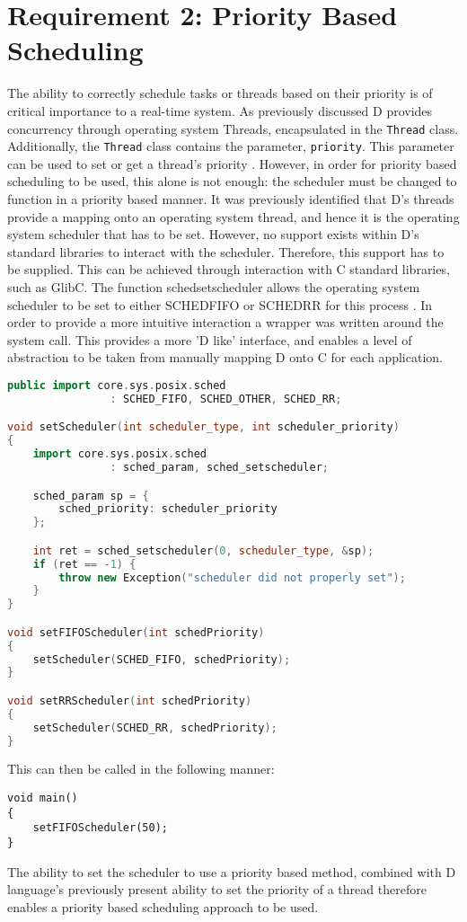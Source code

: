 \section{Requirement 2: Priority Based Scheduling}
The ability to correctly schedule tasks or threads based on their priority is of 
critical importance to a real-time system. As previously discussed D provides 
concurrency through operating system Threads, encapsulated in the
\texttt{Thread} class. Additionally, the \texttt{Thread} class contains the 
parameter, \texttt{priority}. This parameter can be used to set or get a thread's 
priority \cite{core-thread}. 
However, in order for priority based scheduling to be used, this alone is not 
enough: the scheduler must be changed to function in a priority based manner. 
It was previously identified that D's threads provide a mapping onto an operating  
system thread, and hence it is the operating system scheduler that has to be set.  
However, no support exists within D's standard libraries to interact with the
scheduler. 
Therefore, this support has to be supplied. 
This can be achieved through interaction with C standard libraries, such as GlibC. 
The function sched\textunderscore{}setscheduler allows the operating system 
scheduler to be set to either SCHED\textunderscore{}FIFO or SCHED\textunderscore{}RR for 
this process \cite{sched-setscheduler}. 
In order to provide a more intuitive interaction a wrapper was written around the 
system call. This provides a more 'D like' interface, and enables a level of
abstraction to be taken from manually mapping D onto C for each application. 
\begin{lstlisting}[language=C++]
public import core.sys.posix.sched 
                : SCHED_FIFO, SCHED_OTHER, SCHED_RR; 

void setScheduler(int scheduler_type, int scheduler_priority)
{
    import core.sys.posix.sched 
                : sched_param, sched_setscheduler; 

    sched_param sp = { 
        sched_priority: scheduler_priority 
    }; 

    int ret = sched_setscheduler(0, scheduler_type, &sp); 
    if (ret == -1) {
        throw new Exception("scheduler did not properly set");
    }
}

void setFIFOScheduler(int schedPriority)
{
    setScheduler(SCHED_FIFO, schedPriority);
}

void setRRScheduler(int schedPriority)
{
    setScheduler(SCHED_RR, schedPriority); 
}
\end{lstlisting}
This can then be called in the following manner: 
\begin{lstlisting}
void main()
{
    setFIFOScheduler(50); 
}
\end{lstlisting}
The ability to set the scheduler to use a priority based method, combined with 
D language's previously present ability to set the priority of a thread therefore 
enables a priority based scheduling approach to be used.  

